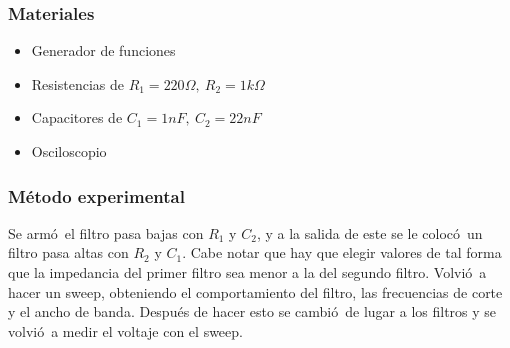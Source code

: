 \documentclass[11pt]{article}
\renewcommand{\=}[1]{\stackrel{#1}{=}} %
\theoremstyle{definition}
\theoremstyle{remark}
\begin{document}
\subsubsection{Materiales}
\begin{itemize}
\item Generador de funciones
\item Resistencias de $R_1=220\Omega,\ R_2=1k\Omega$
\item Capacitores de $C_1=1nF,\ C_2=22nF$
\item Osciloscopio
\end{itemize}

\subsubsection{M\'etodo experimental}
Se arm\'o\ el filtro pasa bajas con $R_1$ y $C_2$, y a la salida de este se le coloc\'o\ un filtro pasa altas con $R_2$ y $C_1$. Cabe notar que hay que elegir valores de tal forma que la impedancia del primer filtro sea menor a la del segundo filtro. Volvi\'o\ a hacer un sweep, obteniendo el comportamiento del filtro, las frecuencias de corte y el ancho de banda. Despu\'es de hacer esto se cambi\'o\ de lugar a los filtros y se volvi\'o\ a medir el voltaje con el sweep. 
\end{document}
